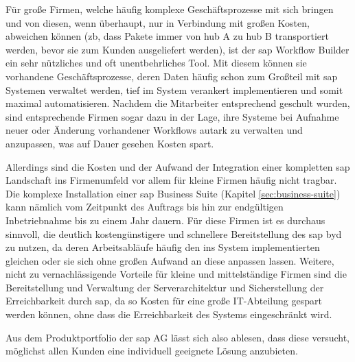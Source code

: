 
Für große Firmen, welche häufig komplexe Geschäftsprozesse mit sich bringen und von diesen, wenn überhaupt, nur in Verbindung mit großen Kosten, abweichen können (\gls{zb}, dass Pakete immer von \gls{hub} A zu \gls{hub} B transportiert werden, bevor sie zum Kunden ausgeliefert werden), ist der \gls{sap} Workflow Builder ein sehr nützliches und oft unentbehrliches Tool. Mit diesem können sie vorhandene Geschäftsprozesse, deren Daten häufig schon zum Großteil mit \gls{sap} Systemen verwaltet werden, tief im System verankert implementieren und somit maximal automatisieren. Nachdem die Mitarbeiter entsprechend geschult wurden, sind entsprechende Firmen sogar dazu in der Lage, ihre Systeme bei Aufnahme neuer oder Änderung vorhandener Workflows autark zu verwalten und anzupassen, was auf Dauer gesehen Kosten spart. 

Allerdings sind die Kosten und der Aufwand der Integration einer kompletten \gls{sap} Landschaft ins Firmenumfeld vor allem für kleine Firmen häufig nicht tragbar. Die komplexe Installation einer \gls{sap} Business Suite (Kapitel \ref{sec:business-suite}) kann nämlich vom Zeitpunkt des Auftrags bis hin zur endgültigen Inbetriebnahme bis zu einem Jahr dauern. Für diese Firmen ist es durchaus sinnvoll, die deutlich kostengünstigere und schnellere Bereitstellung des \gls{sap} \gls{byd} zu nutzen, da deren Arbeitsabläufe häufig den ins System implementierten gleichen oder sie sich ohne großen Aufwand an diese anpassen lassen. Weitere, nicht zu vernachlässigende Vorteile für kleine und mittelständige Firmen sind die Bereitstellung und Verwaltung der Serverarchitektur und Sicherstellung der Erreichbarkeit durch \gls{sap}, da so Kosten für eine große IT-Abteilung gespart werden können, ohne dass die Erreichbarkeit des Systems eingeschränkt wird.

Aus dem Produktportfolio der \gls{sap} AG lässt sich also ablesen, dass diese versucht, möglichst allen Kunden eine individuell geeignete Lösung anzubieten.

